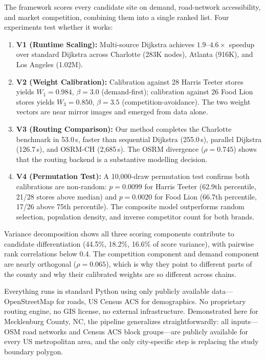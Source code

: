 \documentclass[conference]{IEEEtran}
\begin{document}
The framework scores every candidate site on demand, road-network
accessibility, and market competition, combining them into a single
ranked list. Four experiments test whether it works:
\begin{enumerate}
\setlength{\topsep}{0pt}
\setlength{\partopsep}{0pt}
\setlength{\itemsep}{2pt}
    \item \textbf{V1 (Runtime Scaling):} Multi-source Dijkstra
    achieves $1.9$--$4.6\times$ speedup over standard Dijkstra across
    Charlotte (283K nodes), Atlanta (916K), and Los Angeles (1.02M).

    \item \textbf{V2 (Weight Calibration):} Calibration against 28
    Harris Teeter stores yields $W_1 = 0.984$, $\beta = 3.0$
    (demand-first); calibration against 26 Food Lion stores yields
    $W_3 = 0.850$, $\beta = 3.5$ (competition-avoidance). The two
    weight vectors are near mirror images and emerged from data alone.

    \item \textbf{V3 (Routing Comparison):} Our method completes the
    Charlotte benchmark in 53.0\,s, faster than sequential Dijkstra
    (255.0\,s), parallel Dijkstra (126.7\,s), and OSRM-CH
    (2{,}685\,s). The OSRM divergence ($\rho = 0.745$) shows that
    the routing backend is a substantive modelling decision.

    \item \textbf{V4 (Permutation Test):} A 10{,}000-draw permutation
    test confirms both calibrations are non-random: $p = 0.0099$ for
    Harris Teeter (62.9th percentile, 21/28 stores above median) and
    $p = 0.0020$ for Food Lion (66.7th percentile, 17/26 above 75th
    percentile). The composite model outperforms random selection,
    population density, and inverse competitor count for both brands.
\end{enumerate}

Variance decomposition shows all three scoring components contribute
to candidate differentiation (44.5\%, 18.2\%, 16.6\% of score
variance), with pairwise rank correlations below 0.4. The
competition component and demand component are nearly orthogonal
($\rho = 0.065$), which is why they point to different parts of the
county and why their calibrated weights are so different across chains.

Everything runs in standard Python using only publicly available
data---OpenStreetMap for roads, US Census ACS for demographics. No
proprietary routing engine, no GIS license, no external
infrastructure. Demonstrated here for Mecklenburg County, NC, the
pipeline generalizes straightforwardly: all inputs---OSM road networks
and Census ACS block groups---are publicly available for every US
metropolitan area, and the only city-specific step is replacing the
study boundary polygon.
\end{document}
